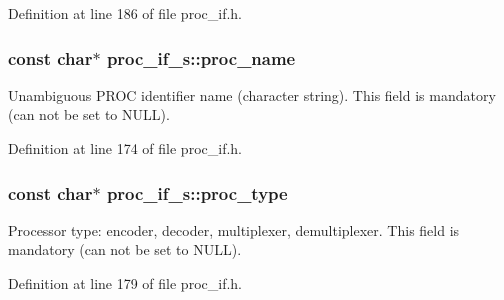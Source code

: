 Definition at line 186 of file proc\+\_\+if.\+h.

\subsubsection[{\texorpdfstring{proc\+\_\+name}{proc_name}}]{\setlength{\rightskip}{0pt plus 5cm}const char$\ast$ proc\+\_\+if\+\_\+s\+::proc\+\_\+name}\hypertarget{structproc__if__s_aa284f1d0bdde2fae0b51101f658430ee}{}\label{structproc__if__s_aa284f1d0bdde2fae0b51101f658430ee}
Unambiguous P\+R\+OC identifier name (character string). This field is mandatory (can not be set to N\+U\+LL). 

Definition at line 174 of file proc\+\_\+if.\+h.

\subsubsection[{\texorpdfstring{proc\+\_\+type}{proc_type}}]{\setlength{\rightskip}{0pt plus 5cm}const char$\ast$ proc\+\_\+if\+\_\+s\+::proc\+\_\+type}\hypertarget{structproc__if__s_a3a8a04d2e81ca4dfa55a8526644dd729}{}\label{structproc__if__s_a3a8a04d2e81ca4dfa55a8526644dd729}
Processor type\+: encoder, decoder, multiplexer, demultiplexer. This field is mandatory (can not be set to N\+U\+LL). 

Definition at line 179 of file proc\+\_\+if.\+h.

